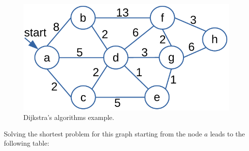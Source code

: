\begin{figure}[H]
	\begin{center}
		\includegraphics[scale=.6]{chapters/appendix/images/appendixgraphs/graphsappendix_3.pdf}
		\caption[Dijkstra's algorithms example.]{Dijkstra's algorithms example.}
		\label{graphappendix_3}
	\end{center}
\end{figure}

Solving the shortest problem for this graph starting from the node \(a\) leads to the following table:


